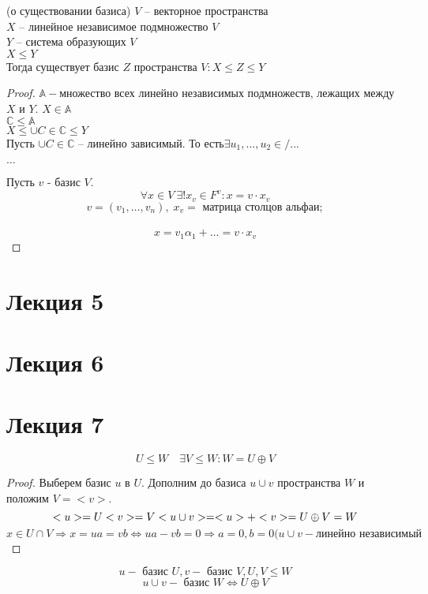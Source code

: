 \documentclass[12pt]{report}
\begin{document}
\begin{thm}(о существовании базиса)
$V $ -- векторное пространства \\
$X$  -- линейное независимое подмножество $V$\\
$Y$ -- система образующих $V$\\
$X \le Y$\\
Тогда существует базис $Z$ пространства $V: X \le Z \le Y$
\end{thm}
\begin{proof}
$\mathbb A - $множество всех линейно независимых подмножеств, лежащих между $X$ и $Y$. $X \in \mathbb A$\\
$\mathbb C \le \mathbb A $\\
$X \le \cup {C \in \mathbb C} \le Y$\\
Пусть $\cup {C \in \mathbb C}$ --  линейно зависимый. То есть$ \exists u_1, ...,  u_2 \in /...$

$\ldots$

Пусть $v$ - базис $V$.\\
$$\forall x \in V \: \exists! x_v \in F^v : x = v \cdot x_v$$
$$v = (v_1, \ldots , v_n), \; x_v = \mbox{ матрица столцов альфа} и;$$\\
$$x = v_1 \alpha_1 + \ldots = v\cdot x_v$$
\end{proof}

\section{Лекция 5}
\section{Лекция 6}

\section{Лекция 7}
\begin{st}
   $$U \le W \quad \exists V \le W : W=U\oplus V$$ 
\end{st}
\begin{proof}
    Выберем базис $u$ в $U$. Дополним до базиса $u \cup v$ пространства $W$ и положим $V = <v>$. $$<u> = U \\ <v>=V \\ <u \cup v> = <u> + <v> = U \oplus V = W$$
    $$ x \in U \cap V \Rightarrow x = ua = vb \Leftrightarrow ua-vb = 0 \Rightarrow a = 0, b = 0 (u \cup v - \mbox{линейно независимый}$$
\end{proof}
\begin{cor}
    $$ u - \mbox{ базис } U, v - \mbox{ базис } V, U, V \le W$$
    $$u \cup v - \mbox{ базис } W \Leftrightarrow U \oplus V$$
\end{cor}
\end{document}
